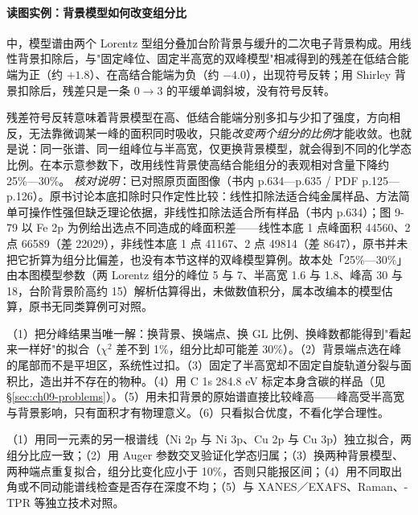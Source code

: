 \paragraph{读图实例：背景模型如何改变组分比}
\begin{obs}
 中，模型谱由两个 Lorentz 型组分叠加台阶背景与缓升的二次电子背景构成。用线性背景扣除后，与"固定峰位、固定半高宽的双峰模型"相减得到的残差在低结合能端为正（约 $+1.8$）、在高结合能端为负（约 $-4.0$），出现符号反转；用 Shirley 背景扣除后，残差只是一条 $0\to3$ 的平缓单调斜坡，没有符号反转。
\end{obs}
\begin{infer}
残差符号反转意味着背景模型在高、低结合能端分别多扣与少扣了强度，方向相反，无法靠微调某一峰的面积同时吸收，只能\emph{改变两个组分的比例}才能收敛。也就是说：同一张谱、同一组峰位与半高宽，仅更换背景模型，就会得到不同的化学态比例。在本示意参数下，改用线性背景使高结合能组分的表观相对含量下降约 25\%—30\%。
\emph{核对说明}：已对照原页面图像（书内 p.634—p.635 / PDF p.125—p.126）。原书讨论本底扣除时只作定性比较：线性扣除法适合纯金属样品、方法简单可操作性强但缺乏理论依据，非线性扣除法适合所有样品（书内 p.634）；图 9-79 以 Fe 2p 为例给出选点不同造成的峰面积差——线性本底 1 点峰面积 44560、2 点 66589（差 22029），非线性本底 1 点 41167、2 点 49814（差 8647），原书并未把它折算为组分比偏差，也没有本节这样的双峰模型算例。故本处「25\%—30\%」由本图模型参数（两 Lorentz 组分的峰位 5 与 7、半高宽 1.6 与 1.8、峰高 30 与 18，台阶背景阶高约 15）解析估算得出，未做数值积分，属本改编本的模型估算，原书无同类算例可对照。
\end{infer}

\begin{pitfall}
（1）把分峰结果当唯一解：换背景、换端点、换 GL 比例、换峰数都能得到"看起来一样好"的拟合（$\chi^{2}$ 差不到 1\%，组分比却可能差 30\%）。（2）背景端点选在峰的尾部而不是平坦区，系统性过扣。（3）固定了半高宽却不固定自旋轨道分裂与面积比，造出并不存在的物种。（4）用 C 1s 284.8 eV 标定本身含碳的样品（见 §\ref{sec:ch09-problems}）。（5）用未扣背景的原始谱直接比较峰高——峰高受半高宽与背景影响，只有面积才有物理意义。（6）只看拟合优度，不看化学合理性。
\end{pitfall}

\begin{crosscheck}
（1）用同一元素的另一根谱线（Ni 2p 与 Ni 3p、Cu 2p 与 Cu 3p）独立拟合，两组分比应一致；（2）用 Auger 参数交叉验证化学态归属；（3）换两种背景模型、两种端点重复拟合，组分比变化应小于 10\%，否则只能报区间；（4）用不同取出角或不同动能谱线检查是否存在深度不均；（5）与 XANES／EXAFS、Raman、-TPR 等独立技术对照。
\end{crosscheck}

